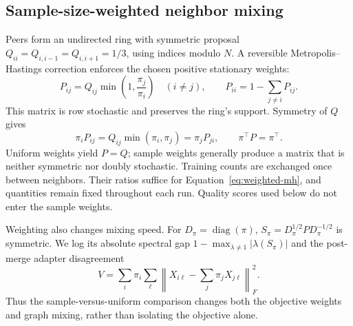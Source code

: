 \documentclass[11pt]{article}
\begin{document}
\subsection{Sample-size-weighted neighbor mixing}
Peers form an undirected ring with symmetric proposal $Q_{ii}=Q_{i,i-1}=Q_{i,i+1}=1/3$, using indices modulo $N$. A reversible Metropolis--Hastings correction enforces the chosen positive stationary weights:
\begin{equation}
 P_{ij}=Q_{ij}\min\left(1,\frac{\pi_j}{\pi_i}\right)\quad(i\ne j),\qquad
 P_{ii}=1-\sum_{j\ne i}P_{ij}.
 \label{eq:weighted-mh}
\end{equation}
This matrix is row stochastic and preserves the ring's support. Symmetry of $Q$ gives
\begin{equation}
 \pi_iP_{ij}=Q_{ij}\min(\pi_i,\pi_j)=\pi_jP_{ji},\qquad \pi^\top P=\pi^\top.
 \label{eq:detailed-balance}
\end{equation}
Uniform weights yield $P=Q$; sample weights generally produce a matrix that is neither symmetric nor doubly stochastic. Training counts are exchanged once between neighbors. Their ratios suffice for Equation~\eqref{eq:weighted-mh}, and quantities remain fixed throughout each run. Quality scores used below do not enter the sample weights.

Weighting also changes mixing speed. For $D_\pi=\operatorname{diag}(\pi)$, $S_\pi=D_\pi^{1/2}PD_\pi^{-1/2}$ is symmetric. We log its absolute spectral gap $1-\max_{\lambda\ne1}|\lambda(S_\pi)|$ and the post-merge adapter disagreement
\begin{equation}
 V=\sum_i\pi_i\sum_\ell\left\|X_{i\ell}-\sum_j\pi_jX_{j\ell}\right\|_F^2.
 \label{eq:disagreement}
\end{equation}
Thus the sample-versus-uniform comparison changes both the objective weights and graph mixing, rather than isolating the objective alone.
\end{document}
